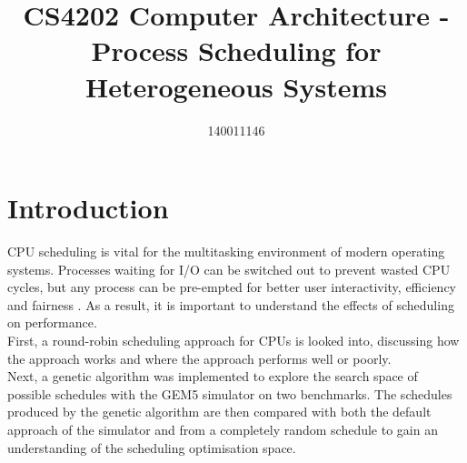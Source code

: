 \documentclass{article}
\title{CS4202 Computer Architecture - Process Scheduling for Heterogeneous Systems}
\author{140011146}
\newcommand{\n}[0]{\\[\baselineskip]}
\begin{document}
\maketitle

\section{Introduction}
CPU scheduling is vital for the multitasking environment of modern operating systems. Processes waiting for I/O can be switched out to prevent wasted CPU cycles, but any process can be pre-empted for better user interactivity, efficiency and fairness \cite{os}. As a result, it is important to understand the effects of scheduling on performance.
\n
First, a round-robin scheduling approach for CPUs is looked into, discussing how the approach works and where the approach performs well or poorly. 
\n
Next, a genetic algorithm was implemented to explore the search space of possible schedules with the GEM5 simulator on two benchmarks. The schedules produced by the genetic algorithm are then compared with both the default approach of the simulator and from a completely random schedule to gain an understanding of the scheduling optimisation space.
\end{document}
